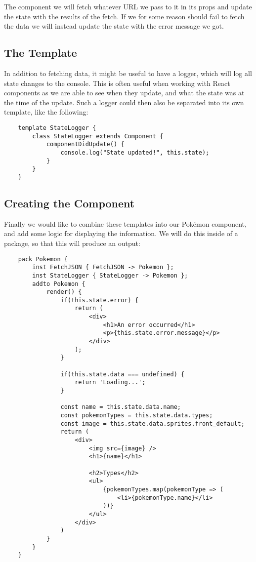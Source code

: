 The  component we will fetch whatever URL we pass to it in its props and update the state with the results of the fetch.
If we for some reason should fail to fetch the data we will instead update the state with the error message we got.

\subsection{The  Template}\label{subsec:the-statelogger-template}

In addition to fetching data, it might be useful to have a logger, which will log all state changes to the console.
This is often useful when working with React components as we are able to see when they update, and what the state was at the time of the update.
Such a logger could then also be separated into its own template, like the following:

\begin{verbatim}
    template StateLogger {
        class StateLogger extends Component {
            componentDidUpdate() {
                console.log("State updated!", this.state);
            }
        }
    }
\end{verbatim}

\subsection{Creating the  Component}\label{subsec:creating-the-pokemon-component}

Finally we would like to combine these templates into our Pokémon component, and add some logic for displaying the information.
We will do this inside of a package, so that this will produce an output:

\begin{verbatim}
    pack Pokemon {
        inst FetchJSON { FetchJSON -> Pokemon };
        inst StateLogger { StateLogger -> Pokemon };
        addto Pokemon {
            render() {
                if(this.state.error) {
                    return (
                        <div>
                            <h1>An error occurred</h1>
                            <p>{this.state.error.message}</p>
                        </div>
                    );
                }

                if(this.state.data === undefined) {
                    return 'Loading...';
                }

                const name = this.state.data.name;
                const pokemonTypes = this.state.data.types;
                const image = this.state.data.sprites.front_default;
                return (
                    <div>
                        <img src={image} />
                        <h1>{name}</h1>

                        <h2>Types</h2>
                        <ul>
                            {pokemonTypes.map(pokemonType => (
                                <li>{pokemonType.name}</li>
                            ))}
                        </ul>
                    </div>
                )
            }
        }
    }
\end{verbatim}

